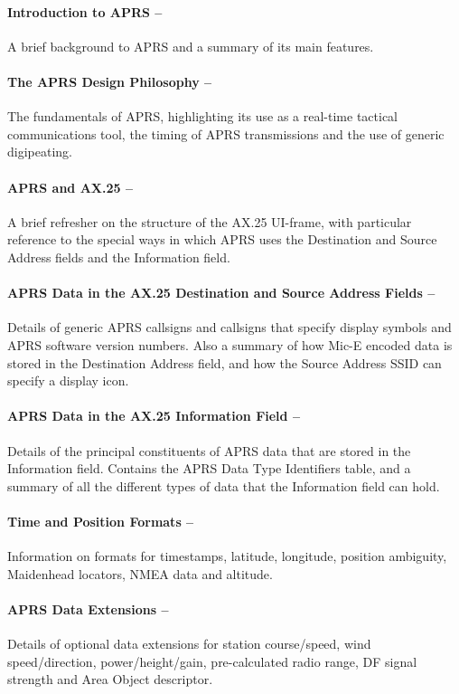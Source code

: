 \documentclass{scrreprt}[letter]
\begin{document}

\paragraph{Introduction to APRS --}A brief background to APRS and a summary of its
main features.

\paragraph{The APRS Design Philosophy --}The fundamentals of APRS, highlighting
its use as a real-time tactical communications tool, the timing of
APRS transmissions and the use of generic digipeating.

\paragraph{APRS and AX.25 --}A brief refresher on the structure of the AX.25
UI-frame, with particular reference to the special ways in which APRS uses
the Destination and Source Address fields and the Information field.

\paragraph{APRS Data in the AX.25 Destination and Source Address Fields --}
Details of generic APRS callsigns and callsigns that specify display symbols
and APRS software version numbers. Also a summary of how Mic-E
encoded data is stored in the Destination Address field, and how the Source
Address SSID can specify a display icon.

\paragraph{APRS Data in the AX.25 Information Field --}Details of the principal
constituents of APRS data that are stored in the Information field. Contains
the APRS Data Type Identifiers table, and a summary of all the different
types of data that the Information field can hold.

\paragraph{Time and Position Formats --}Information on formats for timestamps,
latitude, longitude, position ambiguity, Maidenhead locators, NMEA data
and altitude.

\paragraph{APRS Data Extensions --}Details of optional data extensions for station
course/speed, wind speed/direction, power/height/gain, pre-calculated radio
range, DF signal strength and Area Object descriptor.
\end{document}
